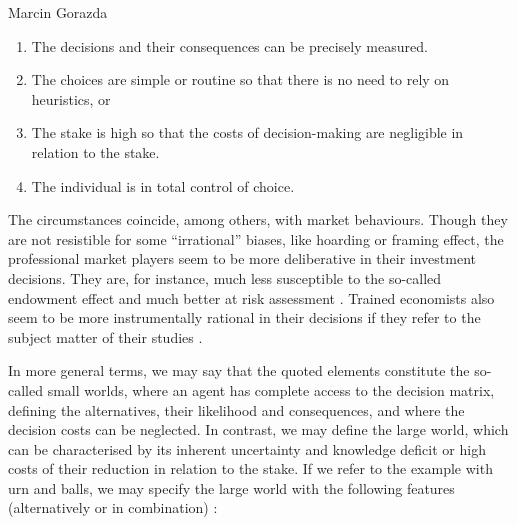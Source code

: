 \begin{artengenv}{Marcin Gorazda}
\begin{enumerate}
\item The decisions and their consequences can be precisely measured.
\item The choices are simple or routine so that there is no need to rely on heuristics, or
\item The stake is high so that the costs of decision-making are negligible in relation to the stake.
\item The individual is in total control of choice.
\end{enumerate}
The circumstances coincide, among others, with market behaviours. Though they are not resistible for some ``irrational'' biases, like hoarding or framing effect, the professional market players seem to be more deliberative in their investment decisions. They are, for instance, much less susceptible to the so-called endowment effect and much better at risk assessment
\parencite[][]{arlen_experimental_2008}. %
 Trained economists also seem to be more instrumentally rational in their decisions if they refer to the subject matter of their studies 
\parencite[][]{frank_does_1993}.%


In more general terms, we may say that the quoted elements constitute the so-called small worlds, where an agent has complete access to the decision matrix, defining the alternatives, their likelihood and consequences, and where the decision costs can be neglected. In contrast, we may define the large world, which can be characterised by its inherent uncertainty and knowledge deficit or high costs of their reduction in relation to the stake. If we refer to the example with urn and balls, we may specify the large world with the following features (alternatively or in combination)
\parencite[][]{gigerenzer_homo_2009}:%



\end{artengenv}
